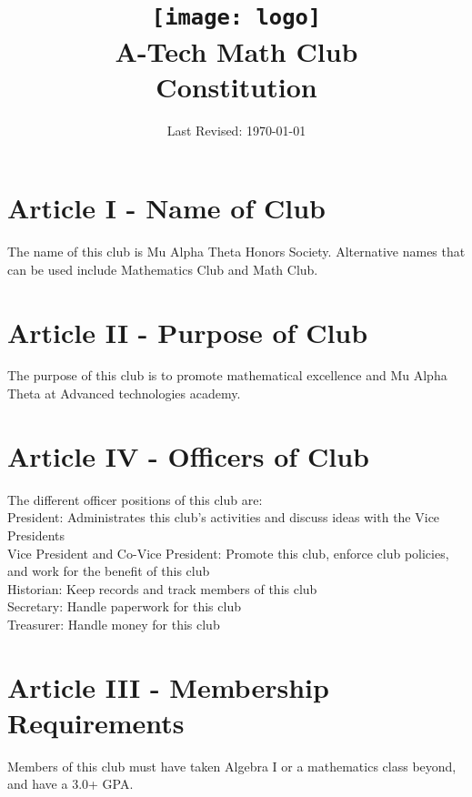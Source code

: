 \documentclass[a4, 12p]{article}
\begin{document}
\title{\texttt{[image: logo]}\\
A-Tech Math Club\\
  Constitution}
\date{Last Revised: \today}

\maketitle

\section*{Article I - Name of Club}
The name of this club is Mu Alpha Theta Honors Society. Alternative names that can be used include Mathematics Club and Math Club.

\section*{Article II - Purpose of Club}
The purpose of this club is to promote mathematical excellence and Mu Alpha Theta at Advanced technologies academy.

\newpage

\section*{Article IV - Officers of Club}
The different officer positions of this club are:\\

President: Administrates this club's activities and discuss ideas with the Vice Presidents\\

Vice President and Co-Vice President: Promote this club, enforce club policies, and work for the benefit of this club\\

Historian: Keep records and track members of this club\\

Secretary: Handle paperwork for this club\\

Treasurer: Handle money for this club\\

\section*{Article III - Membership Requirements}
Members of this club must have taken Algebra I or a mathematics class beyond, and have a 3.0+ GPA.
\end{document}
